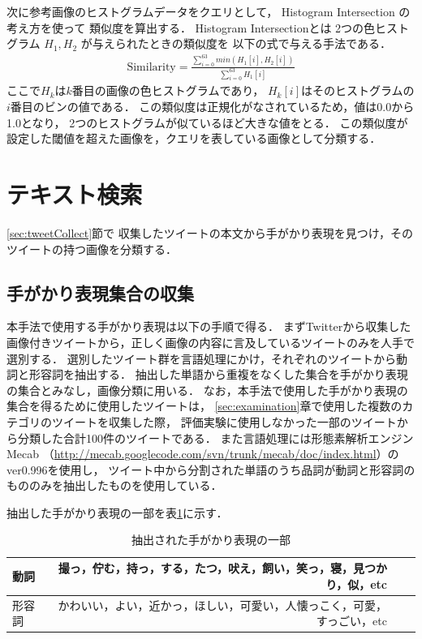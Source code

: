 次に参考画像のヒストグラムデータをクエリとして，
Histogram Intersection
の考え方を使って
類似度を算出する．
Histogram Intersectionとは
2つの色ヒストグラム
$H_1,H_2$
が与えられたときの類似度を
以下の式で与える手法である．
%
\begin{eqnarray}
\mbox{Similarity} = \frac{\sum_{i=0}^{63} min(H_1[i],H_2[i])}{\sum_{i=0}^{63} H_1[i]}
\end{eqnarray}
%
ここで$H_k$は$k$番目の画像の色ヒストグラムであり，
$H_k[i]$はそのヒストグラムの$i$番目のビンの値である．
この類似度は正規化がなされているため，値は0.0から1.0となり，
2つのヒストグラムが似ているほど大きな値をとる．
この類似度が設定した閾値を超えた画像を，クエリを表している画像として分類する．



\section{テキスト検索}
\label{sec:textSearch}
\ref{sec:tweetCollect}節で
収集したツイートの本文から手がかり表現を見つけ，そのツイートの持つ画像を分類する．

\subsection{手がかり表現集合の収集}
本手法で使用する手がかり表現は以下の手順で得る．
まずTwitterから収集した画像付きツイートから，正しく画像の内容に言及しているツイートのみを人手で選別する．
選別したツイート群を言語処理にかけ，それぞれのツイートから動詞と形容詞を抽出する．
抽出した単語から重複をなくした集合を手がかり表現の集合とみなし，画像分類に用いる．
なお，本手法で使用した手がかり表現の集合を得るために使用したツイートは，
\ref{sec:examination}章で使用した複数のカテゴリのツイートを収集した際，
評価実験に使用しなかった一部のツイートから分類した合計100件のツイートである．
また言語処理には形態素解析エンジンMecab
（\url{http://mecab.googlecode.com/svn/trunk/mecab/doc/index.html}）のver0.996を使用し，
ツイート中から分割された単語のうち品詞が動詞と形容詞のもののみを抽出したものを使用している．

抽出した手がかり表現の一部を表\ref{tab:predicate}に示す．

\begin{table}[bt]
\begin{center}
\caption{抽出された手がかり表現の一部}
\label{tab:predicate}
\begin{tabular}{|l|r|r|r|}\hline
動詞& 撮っ，佇む，持っ，する，たつ，吠え，飼い，笑っ，寝，見つかり，似，etc \\ \hline
形容詞& かわいい，よい，近かっ，ほしい，可愛い，人懐っこく，可愛，すっごい，etc \\ \hline
\end{tabular}
\end{center}
\end{table}

